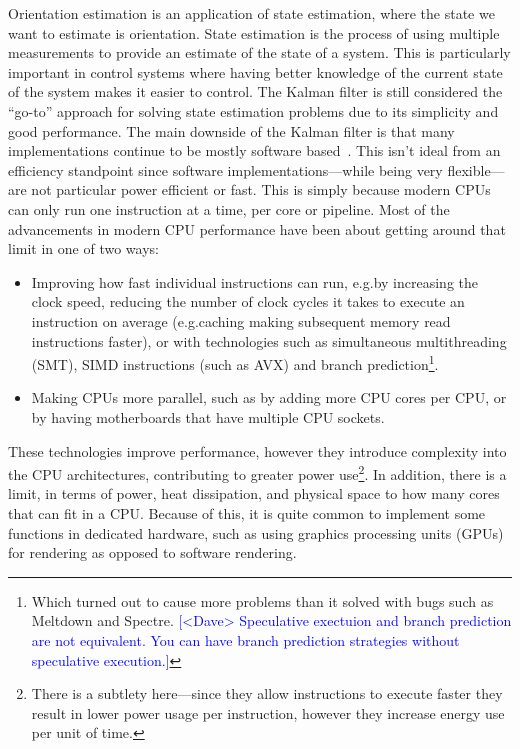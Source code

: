 \documentclass[12pt]{article}
\newcommand{\note}[2][red]{\textcolor{#1}{#2}}
\newcommand{\notedme}[1]{\note[blue]{[<Dave> #1]}}
\begin{document}
Orientation estimation is an application of state estimation, where the state we want to estimate is orientation. State estimation is the process of using multiple measurements to provide an estimate of the state of a system. This is particularly important in control systems where having better knowledge of the current state of the system makes it easier to control. The Kalman filter is still considered the ``go-to'' approach for solving state estimation problems due to its simplicity and good performance. The main downside of the Kalman filter is that many implementations continue to be mostly software based~\cite{ayub_2012}. This isn't ideal from an efficiency standpoint since software implementations---while being very flexible---are not particular power efficient or fast. This is simply because modern CPUs can only run one instruction at a time, per core or pipeline. Most of the advancements in modern CPU performance have been about getting around that limit in one of two ways:
\begin{itemize}
	\item Improving how fast individual instructions can run, e.g.\@ by increasing the clock speed, reducing the number of clock cycles it takes to execute an instruction on average (e.g.\@ caching making subsequent memory read instructions faster), or with technologies such as simultaneous multithreading (SMT), SIMD instructions (such as AVX) and branch prediction\footnote{Which turned out to cause more problems than it solved with bugs such as Meltdown and Spectre. \notedme{Speculative exectuion and branch prediction are not equivalent. You can have branch prediction strategies without speculative execution.} }.
	\item Making CPUs more parallel, such as by adding more CPU cores per CPU, or by having motherboards that have multiple CPU sockets.
\end{itemize}
These technologies improve performance, however they introduce complexity into the CPU architectures, contributing to greater power use\footnote{There is a subtlety here---since they allow instructions to execute faster they result in lower power usage per instruction, however they increase energy use per unit of time.}. In addition, there is a limit, in terms of power, heat dissipation, and physical space to how many cores that can fit in a CPU. Because of this, it is quite common to implement some functions in dedicated hardware, such as using graphics processing units (GPUs) for rendering as opposed to software rendering.
\end{document}

